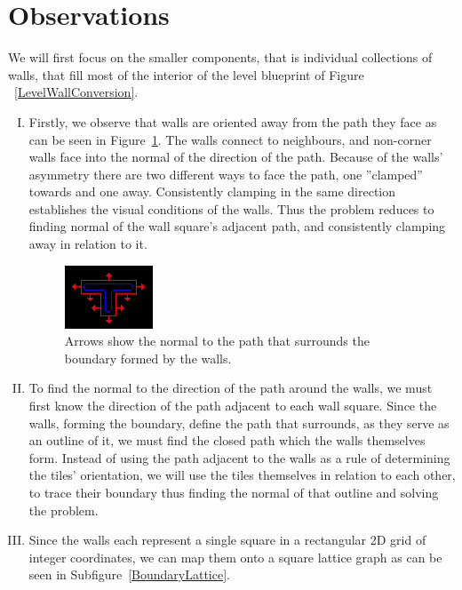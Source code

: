 \section{Observations}
We will first focus on the smaller components, that is individual collections of walls, that fill most of the interior of the level blueprint of Figure ~\ref{LevelWallConversion}.
\begin{enumerate}[I.]
\item Firstly, we observe that walls are oriented away from the path they face as can be seen in Figure~\ref{PathNormal}. The walls connect to neighbours, and non-corner walls face into the normal of the direction of the path. Because of the walls' asymmetry there are two different ways to face the path, one ''clamped'' towards and one away. Consistently clamping in the same direction establishes the visual conditions of the walls. Thus the problem reduces to finding normal of the wall square's adjacent path, and consistently clamping away in relation to it.
\begin{figure}[H]
	\centering
	\includegraphics[width=0.4\linewidth]{Image-6.png}
	\caption {Arrows show the normal to the path that surrounds the boundary formed by the walls.\autocite{myself}} \label{PathNormal}
\end{figure}

\item To find the normal to the direction of the path around the walls, we must first know the direction of the path adjacent to each wall square. Since the walls, forming the boundary, define the path that surrounds, as they serve as an outline of it, we must find the closed path which the walls themselves form.\label{ClosedPathObservation} Instead of using the path adjacent to the walls as a rule of determining the tiles' orientation, we will use the tiles themselves in relation to each other, to trace their boundary thus finding the normal of that outline and solving the problem.

\item Since the walls each represent a single square in a rectangular 2D grid of integer coordinates, we can map them onto a square lattice graph as can be seen in Subfigure~\ref{BoundaryLattice}.\label{SquareLatticeObservation}


\end{enumerate}
